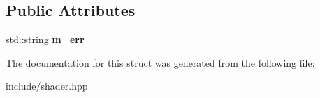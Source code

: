 \subsection*{Public Attributes}
\begin{DoxyCompactItemize}
\item 
\hypertarget{structogls_1_1ShaderException_a02ae515c005ead357aecbd109d1c97fd}{std\-::string {\bfseries m\-\_\-err}}\label{structogls_1_1ShaderException_a02ae515c005ead357aecbd109d1c97fd}

\end{DoxyCompactItemize}


The documentation for this struct was generated from the following file\-:\begin{DoxyCompactItemize}
\item 
include/shader.\-hpp\end{DoxyCompactItemize}
